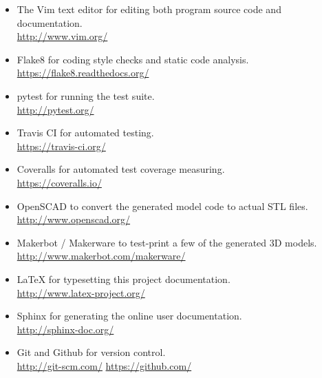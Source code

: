 \begin{itemize}
	\item The Vim text editor for editing both program source code and
		documentation.\\ \url{http://www.vim.org/}
	\item Flake8 for coding style checks and static code analysis.\\
		\url{https://flake8.readthedocs.org/}
	\item pytest for running the test suite.\\
		\url{http://pytest.org/}
	\item Travis CI for automated testing.\\
		\url{https://travis-ci.org/}
	\item Coveralls for automated test coverage measuring.\\
		\url{https://coveralls.io/}
	\item OpenSCAD to convert the generated model code to actual STL files.\\
		\url{http://www.openscad.org/}
	\item Makerbot / Makerware to test-print a few of the generated 3D models.\\
		\url{http://www.makerbot.com/makerware/}
	\item \LaTeX{} for typesetting this project documentation.\\
		\url{http://www.latex-project.org/}
	\item Sphinx for generating the online user documentation.\\
		\url{http://sphinx-doc.org/}
	\item Git and Github for version control.\\
		\url{http://git-scm.com/} \url{https://github.com/}
\end{itemize}
